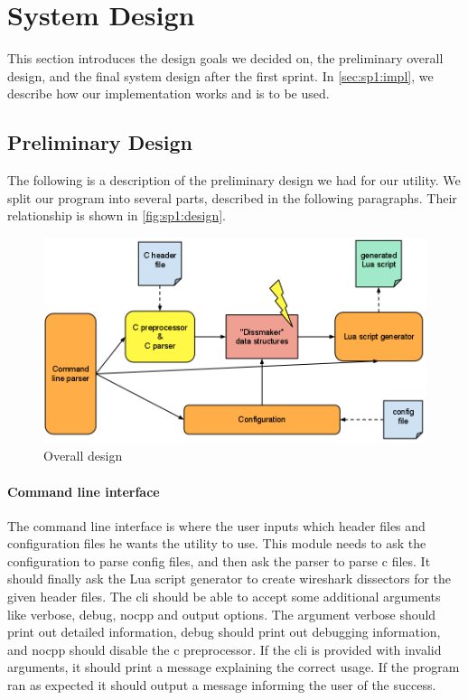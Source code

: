 \section{System Design}
\label{sec:sp1:design}
This section introduces the design goals we decided on, the preliminary overall
design, and the final system design after the first sprint. In
\autoref{sec:sp1:impl}, we describe how our implementation works and is to be
used.

\subsection{Preliminary Design}
The following is a description of the preliminary design we had for our
\gls{utility}. We split our program into several parts, described in the
following paragraphs. Their relationship is shown in
\autoref{fig:sp1:design}.

\begin{figure}[!htb]
	\center
	\includegraphics[width=\textwidth]{./sprints/img/design}
	\caption{Overall design\label{fig:sp1:design}}
\end{figure}

\paragraph{Command line interface}
The command line interface is where the user inputs which \gls{header} files and
configuration files he wants the \gls{utility} to use. This module needs to ask
the configuration to parse config files, and then ask the parser to parse \Gls{c}
files. It should finally ask the Lua script generator to create \Gls{wireshark} \glspl{dissector}
for the given \gls{header} files. The \gls{cli} should be able to accept some additional
arguments like verbose, debug, nocpp and output options.
The argument verbose should print out detailed information,
debug should print out debugging information, and nocpp should
disable the \Gls{c} \gls{preprocessor}. If the \gls{cli} is provided with invalid arguments, 
it should print a message explaining the correct usage.
If the program ran as expected it should output a message informing
the user of the success. 

